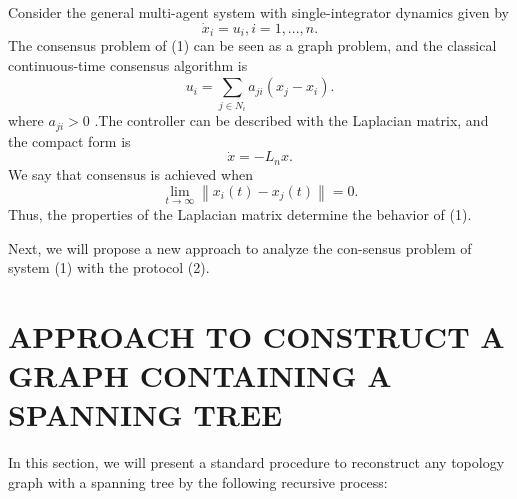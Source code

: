\documentclass[english]{cccconf}
\begin{document}
Consider the general multi-agent system with single-integrator dynamics given by
\begin{equation}  \label{1}
{\dot x_i} = u_i,i = 1,...,n.
\end{equation}
The consensus problem of (1) can be seen as a graph problem,  and the classical continuous-time consensus algorithm is
\begin{equation}  \label{2}
u_i = \sum\limits_{j \in {N_i}}^{} {{a_{ji}}({x_j} - {x_i})}.
\end{equation}
where ${a_{ji}} > 0$ .The controller can be described with the Laplacian matrix, and the  compact form is
\begin{equation}  \label{3}
\dot x =  - {L_n}x.
\end{equation}
We say that consensus is achieved when
\[\mathop {\lim }\limits_{t \to \infty } \left\| {{x_i}(t) - {x_j}(t)} \right\| = 0.\]
Thus, the properties of the Laplacian matrix  determine the behavior of  (1).

Next, we will propose a new approach to analyze the con-sensus problem of system (1) with the protocol (2).


\section{APPROACH TO CONSTRUCT A GRAPH CONTAINING A SPANNING TREE}
In this section, we will present a standard procedure to reconstruct any topology graph with a spanning tree by the following recursive process:
\end{document}
